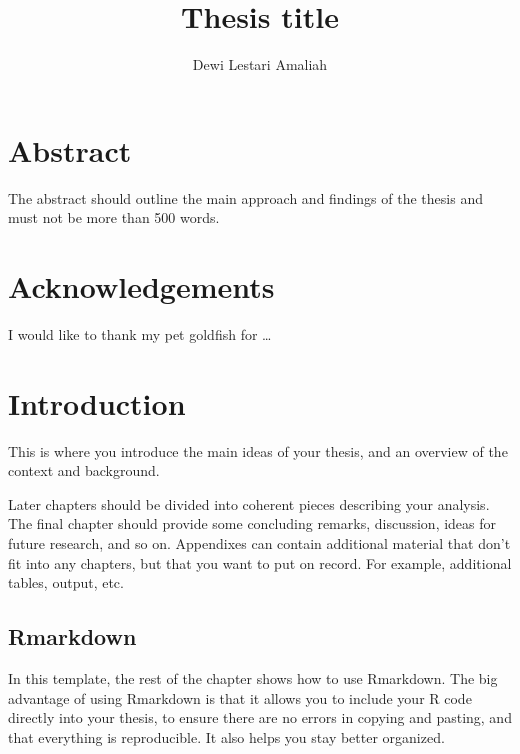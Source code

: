 \documentclass{monashthesis}
\author{Dewi Lestari Amaliah}
\title{Thesis title}
\begin{document}

\titlepage

{\sf\tighttoc\doublespacing}

\clearpage{}\setcounter{page}{0}

\hypertarget{abstract}{%
\chapter*{Abstract}\label{abstract}}

The abstract should outline the main approach and findings of the thesis and must not be more than 500 words.

\newpage

\hypertarget{acknowledgements}{%
\chapter*{Acknowledgements}\label{acknowledgements}}

I would like to thank my pet goldfish for \dots

\hypertarget{ch:intro}{%
\chapter{Introduction}\label{ch:intro}}

This is where you introduce the main ideas of your thesis, and an overview of the context and background.

Later chapters should be divided into coherent pieces describing your analysis. The final chapter should provide some concluding remarks, discussion, ideas for future research, and so on. Appendixes can contain additional material that don't fit into any chapters, but that you want to put on record. For example, additional tables, output, etc.

\hypertarget{rmarkdown}{%
\section{Rmarkdown}\label{rmarkdown}}

In this template, the rest of the chapter shows how to use Rmarkdown. The big advantage of using Rmarkdown is that it allows you to include your R code directly into your thesis, to ensure there are no errors in copying and pasting, and that everything is reproducible. It also helps you stay better organized.
\end{document}
